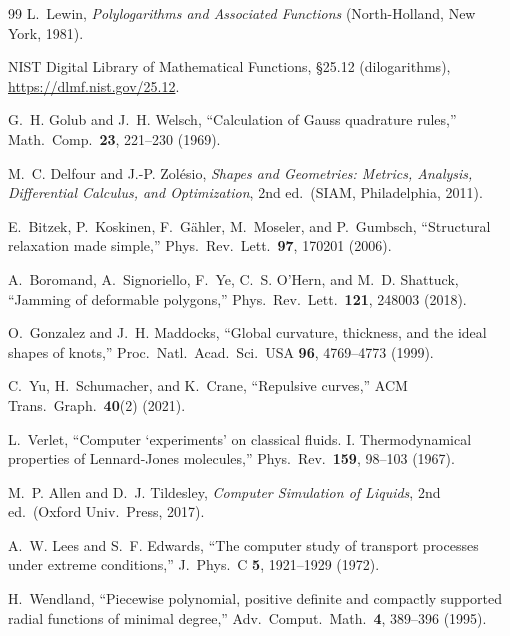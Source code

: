 \documentclass[11pt]{article}
\begin{document}
\begin{thebibliography}{99}
 L.~Lewin,
\emph{Polylogarithms and Associated Functions} (North-Holland, New York, 1981).

 NIST Digital Library of Mathematical Functions,
\S25.12 (dilogarithms), \url{https://dlmf.nist.gov/25.12}.

 G.~H. Golub and J.~H. Welsch,
``Calculation of Gauss quadrature rules,''
Math.\ Comp.\ \textbf{23}, 221--230 (1969).

 M.~C. Delfour and J.-P. Zol\'esio,
\emph{Shapes and Geometries: Metrics, Analysis, Differential Calculus, and
Optimization}, 2nd ed.\ (SIAM, Philadelphia, 2011).

 E.~Bitzek, P.~Koskinen, F.~G\"ahler, M.~Moseler, and
P.~Gumbsch, ``Structural relaxation made simple,''
Phys.\ Rev.\ Lett.\ \textbf{97}, 170201 (2006).

 A.~Boromand, A.~Signoriello, F.~Ye, C.~S. O'Hern, and
M.~D. Shattuck, ``Jamming of deformable polygons,''
Phys.\ Rev.\ Lett.\ \textbf{121}, 248003 (2018).

 O.~Gonzalez and J.~H. Maddocks,
``Global curvature, thickness, and the ideal shapes of knots,''
Proc.\ Natl.\ Acad.\ Sci.\ USA \textbf{96}, 4769--4773 (1999).

 C.~Yu, H.~Schumacher, and K.~Crane,
``Repulsive curves,'' ACM Trans.\ Graph.\ \textbf{40}(2) (2021).

 L.~Verlet,
``Computer `experiments' on classical fluids. I. Thermodynamical properties of
Lennard-Jones molecules,'' Phys.\ Rev.\ \textbf{159}, 98--103 (1967).

 M.~P. Allen and D.~J. Tildesley,
\emph{Computer Simulation of Liquids}, 2nd ed.\ (Oxford Univ.\ Press, 2017).

 A.~W. Lees and S.~F. Edwards,
``The computer study of transport processes under extreme conditions,''
J.\ Phys.\ C \textbf{5}, 1921--1929 (1972).

 H.~Wendland,
``Piecewise polynomial, positive definite and compactly supported radial functions
of minimal degree,'' Adv.\ Comput.\ Math.\ \textbf{4}, 389--396 (1995).

\end{thebibliography}
\end{document}
